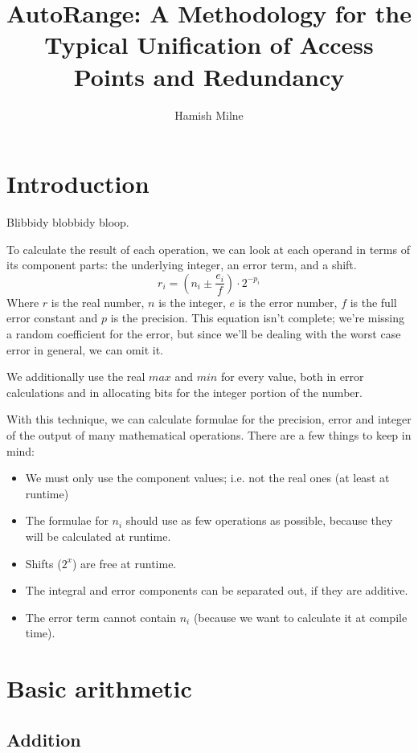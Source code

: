\documentclass[10pt,a4paper]{article}
\author{Hamish Milne}
\title{AutoRange: A Methodology for the Typical Unification of Access Points and Redundancy}
\numberwithin{equation}{section}
\numberwithin{equation}{subsection}
\begin{document}
	
	\maketitle
	
	\section{Introduction}
	
	Blibbidy blobbidy bloop.
	
	To calculate the result of each operation, we can look at each operand in terms of its component parts: the underlying integer, an error term, and a shift.
	\begin{equation}
	r_i = (n_i \pm \frac{e_i}{f})\cdot 2^{-p_i}
	\end{equation}
	Where $r$ is the real number, $n$ is the integer, $e$ is the error number, $f$ is the full error constant and $p$ is the precision. This equation isn't complete; we're missing a random coefficient for the error, but since we'll be dealing with the worst case error in general, we can omit it.
	
	We additionally use the real $max$ and $min$ for every value, both in error calculations and in allocating bits for the integer portion of the number.
	
	With this technique, we can calculate formulae for the precision, error and integer of the output of many mathematical operations. There are a few things to keep in mind:
	\begin{itemize}
		\item We must only use the component values; i.e. not the real ones (at least at runtime)
		\item The formulae for $n_i$ should use as few operations as possible, because they will be calculated at runtime.
		\item Shifts ($2^x$) are free at runtime.
		\item The integral and error components can be separated out, if they are additive.
		\item The error term cannot contain $n_i$ (because we want to calculate it at compile time).
	\end{itemize}
	
	\section{Basic arithmetic}
	
	\subsection{Addition}
	
\end{document}
